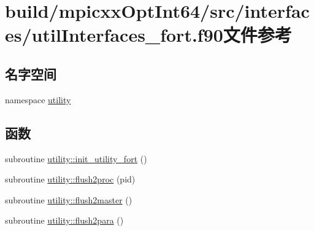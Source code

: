 \hypertarget{build_2mpicxxOptInt64_2src_2interfaces_2utilInterfaces__fort_8f90}{
\section{build/mpicxxOptInt64/src/interfaces/utilInterfaces\_\-fort.f90文件参考}
\label{build_2mpicxxOptInt64_2src_2interfaces_2utilInterfaces__fort_8f90}
}
\subsection*{名字空间}
\begin{DoxyCompactItemize}
\item 
namespace \hyperlink{namespaceutility}{utility}
\end{DoxyCompactItemize}
\subsection*{函数}
\begin{DoxyCompactItemize}
\item 
subroutine \hyperlink{namespaceutility_aa465c4557a921fb97082d392421be1e7}{utility::init\_\-utility\_\-fort} ()
\item 
subroutine \hyperlink{namespaceutility_af89f3f402d624699dfad6c027d71d0cd}{utility::flush2proc} (pid)
\item 
subroutine \hyperlink{namespaceutility_a9253f21bd4ce5431fc25424cf9784dd2}{utility::flush2master} ()
\item 
subroutine \hyperlink{namespaceutility_a923d7c8623e057e6cfda701520ce279d}{utility::flush2para} ()
\end{DoxyCompactItemize}
